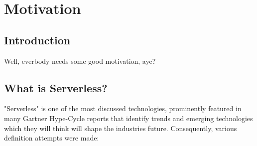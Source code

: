 \chapter{Motivation}


\section{Introduction}

Well, everbody needs some good motivation, aye?

\section{What is Serverless?}\label{sec:whatIsServerless}

"Serverless" is one of the most discussed technologies, prominently featured in many Gartner Hype-Cycle reports that identify trends and emerging technologies which they will think will shape the industries future. 
\autocite{Smith2017Hype2017}\highcomma
\autocite{Weiss2017Hype2017}\highcomma
\autocite{Natis2017Hype2017}\highcomma
\autocite{Walker2017Hype2017}\highcomma
\autocite{DawsonPhilip2017Hype2017}
Consequently, various definition attempts were made:


